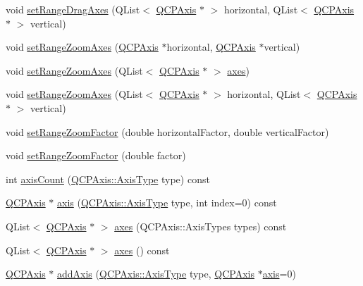 \begin{DoxyCompactItemize}
\item 
void \hyperlink{classQCPAxisRect_a8366903edcb3bb703a8b0be783a85746}{set\+Range\+Drag\+Axes} (Q\+List$<$ \hyperlink{classQCPAxis}{Q\+C\+P\+Axis} $\ast$ $>$ horizontal, Q\+List$<$ \hyperlink{classQCPAxis}{Q\+C\+P\+Axis} $\ast$ $>$ vertical)
\item 
void \hyperlink{classQCPAxisRect_a9442cca2aa358405f39a64d51eca13d2}{set\+Range\+Zoom\+Axes} (\hyperlink{classQCPAxis}{Q\+C\+P\+Axis} $\ast$horizontal, \hyperlink{classQCPAxis}{Q\+C\+P\+Axis} $\ast$vertical)
\item 
void \hyperlink{classQCPAxisRect_a89c1ab7ee6d2a14b56c57c9a796ba623}{set\+Range\+Zoom\+Axes} (Q\+List$<$ \hyperlink{classQCPAxis}{Q\+C\+P\+Axis} $\ast$ $>$ \hyperlink{classQCPAxisRect_a66654d51ca611ef036ded36250cd2518}{axes})
\item 
void \hyperlink{classQCPAxisRect_ae29d6e9e54ebd981769c986e498ae118}{set\+Range\+Zoom\+Axes} (Q\+List$<$ \hyperlink{classQCPAxis}{Q\+C\+P\+Axis} $\ast$ $>$ horizontal, Q\+List$<$ \hyperlink{classQCPAxis}{Q\+C\+P\+Axis} $\ast$ $>$ vertical)
\item 
void \hyperlink{classQCPAxisRect_a895d7ac745ea614e04056244b3c138ac}{set\+Range\+Zoom\+Factor} (double horizontal\+Factor, double vertical\+Factor)
\item 
void \hyperlink{classQCPAxisRect_ae83d187b03fc6fa4f00765ad50cd3fc3}{set\+Range\+Zoom\+Factor} (double factor)
\item 
int \hyperlink{classQCPAxisRect_a16e3e4646e52e4b5d5b865076c29ae58}{axis\+Count} (\hyperlink{classQCPAxis_ae2bcc1728b382f10f064612b368bc18a}{Q\+C\+P\+Axis\+::\+Axis\+Type} type) const 
\item 
\hyperlink{classQCPAxis}{Q\+C\+P\+Axis} $\ast$ \hyperlink{classQCPAxisRect_a560de44e47a4af0f86c59102a094b1e4}{axis} (\hyperlink{classQCPAxis_ae2bcc1728b382f10f064612b368bc18a}{Q\+C\+P\+Axis\+::\+Axis\+Type} type, int index=0) const 
\item 
Q\+List$<$ \hyperlink{classQCPAxis}{Q\+C\+P\+Axis} $\ast$ $>$ \hyperlink{classQCPAxisRect_a66654d51ca611ef036ded36250cd2518}{axes} (Q\+C\+P\+Axis\+::\+Axis\+Types types) const 
\item 
Q\+List$<$ \hyperlink{classQCPAxis}{Q\+C\+P\+Axis} $\ast$ $>$ \hyperlink{classQCPAxisRect_a18dcdc0dd6c7520bc9f3d15a7a3feec2}{axes} () const 
\item 
\hyperlink{classQCPAxis}{Q\+C\+P\+Axis} $\ast$ \hyperlink{classQCPAxisRect_a2dc336092ccc57d44a46194c8a23e4f4}{add\+Axis} (\hyperlink{classQCPAxis_ae2bcc1728b382f10f064612b368bc18a}{Q\+C\+P\+Axis\+::\+Axis\+Type} type, \hyperlink{classQCPAxis}{Q\+C\+P\+Axis} $\ast$\hyperlink{classQCPAxisRect_a560de44e47a4af0f86c59102a094b1e4}{axis}=0)

\end{DoxyCompactItemize}
